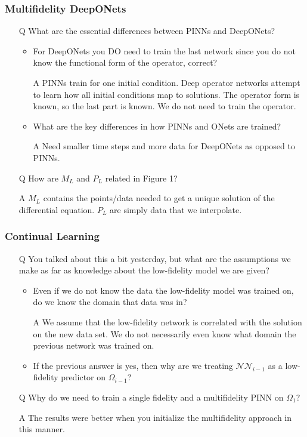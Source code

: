 \documentclass{article}
\begin{document}
\subsubsection*{Multifidelity DeepONets}
\begin{itemize}
	\item[Q] What are the essential differences between PINNs and DeepONets?
	\begin{itemize}
		\item For DeepONets you DO need to train the last network since you do not know the functional form of the operator, correct?
		\item[A] PINNs train for one initial condition. Deep operator networks attempt to learn how all initial conditions map to solutions. The operator form is known, so the last part is known. We do not need to train the operator.
		\item What are the key differences in how PINNs and ONets are trained?
		\item[A] Need smaller time steps and more data for DeepONets as opposed to PINNs.
	\end{itemize}
	\item[Q] How are $M_L$ and $P_L$ related in Figure 1?
	\item[A] $M_L$ contains the points/data needed to get a unique solution of the differential equation. $P_L$ are simply data that we interpolate.
\end{itemize}
\subsubsection*{Continual Learning}
\begin{itemize}
	\item[Q] You talked about this a bit yesterday, but what are the assumptions we make as far as knowledge about the low-fidelity model we are given? 
	\begin{itemize}
		\item Even if we do not know the data the low-fidelity model was trained on, do we know the domain that data was in?
		\item[A] We assume that the low-fidelity network is correlated with the solution on the new data set. We do not necessarily even know what domain the previous network was trained on.
		\item If the previous answer is yes, then why are we treating $\mathcal{NN}_{i-1}$ as a low-fidelity predictor on $\Omega_{i-1}$?
	\end{itemize}
	\item[Q] Why do we need to train a single fidelity and a multifidelity PINN on $\Omega_1$? 
	\item[A] The results were better when you initialize the multifidelity approach in this manner.
\end{itemize}
\end{document}
